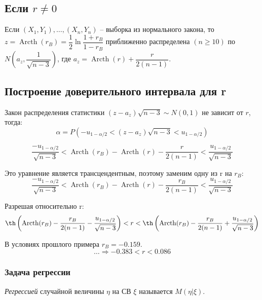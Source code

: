 \subsection{Если $r \neq 0$}

\begin{theorem}[Фишера]
  Если $(X_1, Y_1), \dots, (X_n, Y_n)$ -- выборка из нормального закона, то
  $z = \operatorname{Arcth} (r_B) = \dfrac{1}{2} \ln \dfrac{1 + r_B}{1 - r_B}$
  приближенно распределена $(n \geqslant 10)$ по
  $N\left(a_z, \dfrac{1}{\sqrt{n-3}}\right)$, где
  $a_z = \operatorname{Arcth} (r) + \dfrac{r}{2(n-1)}$.
\end{theorem}

\subsection{Построение доверительного интервала для r}

Закон распределения статистики $(z-a_z) \sqrt{n-3} \sim N(0, 1)$ не зависит от $r$, тогда:
\[
  \alpha = P(-u_{1-\alpha/2} < (z-a_z) \sqrt{n-3} < u_{1 - \alpha/2})
\]

\[
  \dfrac{-u_{1-\alpha/2}}{\sqrt{n-3}} < \operatorname{Arcth} (r_B) - \operatorname{Arcth} (r) - \dfrac{r}{2(n-1)} < \dfrac{u_{1-\alpha/2}}{\sqrt{n-3}}
\]

Это уравнение является трансцендентным, поэтому заменим одну из r на $r_B$:
\[
  \dfrac{-u_{1-\alpha/2}}{\sqrt{n-3}} < \operatorname{Arcth} (r_B) - \operatorname{Arcth} (r) - \dfrac{r_B}{2(n-1)} < \dfrac{u_{1-\alpha/2}}{\sqrt{n-3}}
\]

Разрешая относительно r:
\[
  \th \left( \operatorname{Arcth}(r_B) - \dfrac{r_B}{2(n-1)} - \dfrac{u_{1-\alpha/2}}{\sqrt{n-3}} \right)
  < r
  < \th \left( \operatorname{Arcth}(r_B) - \dfrac{r_B}{2(n-1)} + \dfrac{u_{1-\alpha/2}}{\sqrt{n-3}} \right)
\]

\begin{ex}
  В условиях прошлого примера $r_B = -0.159$.
  \[
    \dots \Rightarrow -0.383 < r < 0.086
  \]
\end{ex}

\subsubsection{Задача регрессии}

\begin{definition}
  \emph{Регрессией} случайной величины $\eta$ на СВ $\xi$ называется $M(\eta | \xi)$.   
\end{definition}

